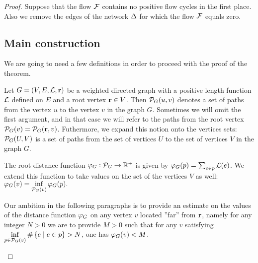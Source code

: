 \documentclass[12pt]{amsart}
\begin{document}
\begin{proof}
      Suppose that the flow $\mathcal{F}$ contains no positive flow cycles in the first place.
      Also we remove the edges of the network $\Delta$ for which the flow $\mathcal{F}$ equals zero.

    \subsection{Main construction}
      We are going to need a few definitions in order to proceed with the proof of the theorem.
      \begin{definition}
        Let $G = (V, E,\mathcal{L}, \mathbf{r})$ be a weighted directed graph with a positive
          length function $\mathcal{L}$ defined on $E$ and a root vertex $\mathbf{r} \in V$.
        Then $\mathcal{P}_{G}(u, v)$ denotes a set of paths from the vertex $u$ to the vertex $v$ in the graph $G$.
        Sometimes we will omit the first argument, and in that case we will refer to the paths from the root vertex
          $\mathcal{P}_{G}(v) = \mathcal{P}_{G}(\mathbf{r}, v)$.
        Futhermore, we expand this notion onto the vertices sets: $\mathcal{P}_{G}(U,V)$ is a set of paths
          from the set of vertices $U$ to the set of vertices $V$ in the graph $G$.
      \end{definition}
      \begin{definition}
        The root-distance function $\varphi_{G}: \mathcal{P}_{G} \to \mathbb{R}^{+}$ is given by $\varphi_{G}(p) = \sum_{e \in p} \mathcal{L}(e)$.
        We extend this function to take values on the set of the vertices $V$ as well: $\varphi_{G}(v) = \displaystyle\inf_{\mathcal{P}_{G}(v)} \varphi_{G}(p).$
      \end{definition}
      \begin{remark}
        Our ambition in the following paragraphs is to provide an estimate on the values of the distance function $\varphi_{G}$ on any vertex $v$
          located ''far'' from $\mathbf{r}$, namely for any integer $N > 0$ we are to provide $M > 0$ such that
          for any $v$ satisfying $\displaystyle\inf_{p \in \mathcal{P}_{G}(v)} \#\left\{ e \mid e \in p\right\} > N$, one has $\varphi_{G}(v) < M$.
      \end{remark}


\end{proof}
\end{document}
